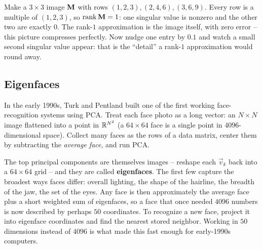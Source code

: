 \begin{labbox}
Make a $3\times3$ image $\mathbf{M}$ with rows $(1,2,3),(2,4,6),(3,6,9)$. Every
row is a multiple of $(1,2,3)$, so $\operatorname{rank}\mathbf{M}=1$: one singular value is nonzero
and the other two are exactly $0$. The rank-$1$ approximation is the image itself,
with zero error -- this picture compresses perfectly. Now nudge one entry by
$0.1$ and watch a small second singular value appear: that is the ``detail'' a
rank-$1$ approximation would round away.
\end{labbox}

\subsection{Eigenfaces}

In the early 1990s, Turk and Pentland built one of the first working face-recognition
systems using PCA. Treat each face photo as a long vector: an
$N\times N$ image flattened into a point in $\mathbb{R}^{N^2}$ (a $64\times64$ face is a
single point in $4096$-dimensional space). Collect many faces as the rows of a data
matrix, center them by subtracting the \emph{average face}, and run PCA.

The top principal components are themselves images -- reshape each $\vec v_k$ back
into a $64\times64$ grid -- and they are called \textbf{eigenfaces}. The first few
capture the broadest ways faces differ: overall lighting, the shape of the
hairline, the breadth of the jaw, the set of the eyes. Any face is then
approximately the average face plus a short weighted sum of eigenfaces, so a face
that once needed $4096$ numbers is now described by perhaps $50$ coordinates. To
recognize a new face, project it into eigenface coordinates and find the nearest
stored neighbor. Working in $50$ dimensions instead of $4096$ is what made this
fast enough for early-1990s computers.

